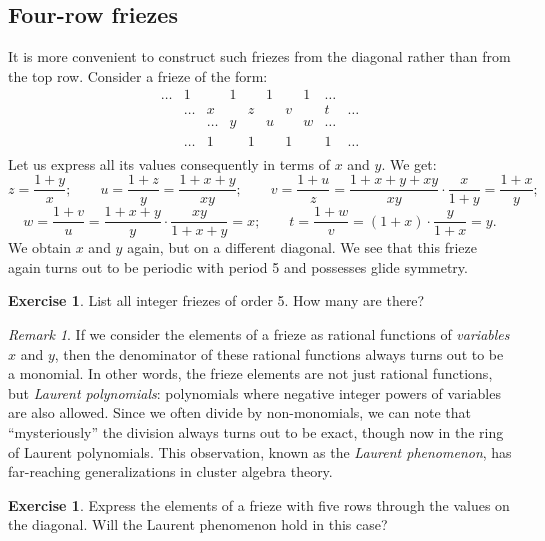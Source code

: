 \documentclass[a4paper,11pt]{amsart}
\theoremstyle{plain}
\theoremstyle{remark}
\newtheorem{remark}[theorem]{Remark}
\theoremstyle{definition}
\newtheorem{exercise}[theorem]{Exercise}
\numberwithin{equation}{section}
\numberwithin{figure}{section}
\begin{document}
\subsection{Four-row friezes} It is more convenient to construct such friezes from the diagonal rather than from the top row. Consider a frieze of the form:
\[
\begin{array}{ccccccccccccccccccccc}
\dots &1 && 1&& 1&& 1& \dots\\
&\dots & x&& z && v && t&\dots\\ 
&&\dots & y && u && w& \dots\\
&\dots & 1&& 1&& 1&& 1& \dots\\
\end{array}
\]
Let us express all its values consequently in terms of $x$ and $y$. We get:
\[
z=\frac{1+y}{x};\qquad u=\frac{1+z}{y}=\frac{1+x+y}{xy};\qquad v=\frac{1+u}{z}=\frac{1+x+y+xy}{xy}\cdot\frac{x}{1+y}=\frac{1+x}{y};
\]
\[
w=\frac{1+v}{u}=\frac{1+x+y}{y}\cdot\frac{xy}{1+x+y}=x;\qquad t=\frac{1+w}{v}=(1+x)\cdot\frac{y}{1+x}=y.
\]
We obtain $x$ and $y$ again, but on a different diagonal. We see that this frieze again turns out to be periodic with period 5 and possesses glide symmetry.

\begin{exercise}
List all integer friezes of order 5. How many are there?
\end{exercise}

\begin{small}
\begin{remark} If we consider the  elements of a frieze as rational functions of \emph{variables} $x$ and $y$, then the denominator of these rational functions always turns out to be a monomial. In other words, the frieze elements are not just rational functions, but \emph{Laurent polynomials}: polynomials where negative integer powers of variables are also allowed. Since we often divide by non-monomials, we can note that ``mysteriously'' the division always turns out to be exact, though now in the ring of Laurent polynomials. This observation, known as the \emph{Laurent phenomenon}, has far-reaching generalizations in cluster algebra theory.
\end{remark}
\end{small}

\begin{exercise}
Express the elements of a frieze with five rows through the values on the diagonal. Will the Laurent phenomenon hold in this case?
\end{exercise}
\end{document}
